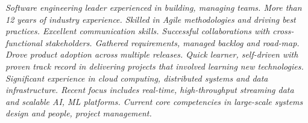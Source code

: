 {\selectfont
	\begin{justify}\textit{Software engineering leader experienced in building, managing teams. More than 12 years of industry experience. Skilled in Agile methodologies and driving best practices. Excellent communication skills. Successful collaborations with cross-functional stakeholders. Gathered requirements, managed backlog and road-map. Drove product adoption across multiple releases. Quick learner, self-driven with proven track record in delivering projects that involved learning new technologies. Significant experience in cloud computing, distributed systems and data infrastructure. Recent focus includes real-time, high-throughput streaming data and scalable AI, ML platforms. Current core competencies in large-scale systems design and people, project management.}\end{justify}
}